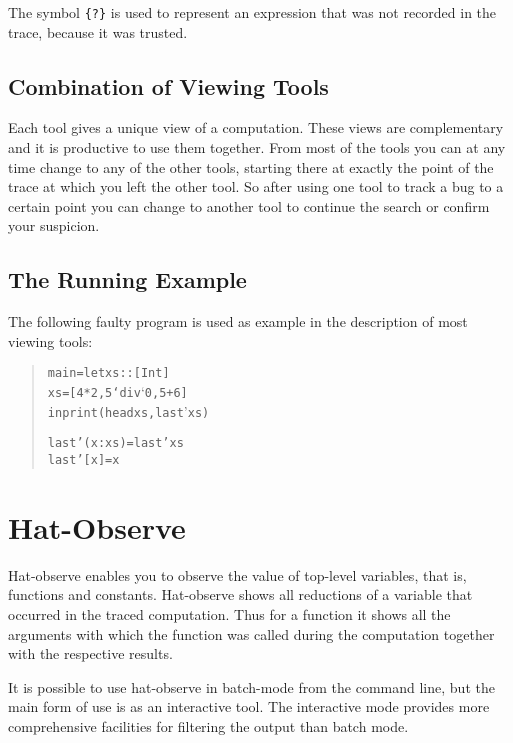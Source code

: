 \documentclass[12pt]{article}
\begin{document}
The symbol \texttt{\{?\}} is used to represent an expression that
was not recorded in the trace, because it was trusted.

\subsection{Combination of Viewing Tools}

Each tool gives a unique view of a computation.  These views are
complementary and it is productive to use them together.  From
most of the tools you can at any
time change to any of the other tools, starting there at exactly
the point of the trace at which you left the other tool. So after
using one tool to track a bug to a certain point you can change to
another tool to continue the search or confirm your suspicion.

\subsection{The Running Example}

The following faulty program is used as example in the description
of most viewing tools:
\begin{quote}
\begin{alltt}
main = let xs :: [Int]
           xs = [4*2, 5`div`0, 5+6]
       in  print (head xs, last' xs)

last' (x:xs) = last' xs
last' [x] = x
\end{alltt}
\end{quote}



\section{Hat-Observe}\label{hat-observe}

Hat-observe enables you to observe the value of top-level variables,
that is, functions and constants. Hat-observe shows all reductions of
a variable that occurred in the traced computation. Thus for a function
it shows all the arguments with which the function was called during
the computation together with the respective results.

It is possible to use hat-observe in batch-mode from the command line,
but the main form of use is as an interactive tool.  The interactive
mode provides more comprehensive facilities for filtering the output
than batch mode.
\end{document}
